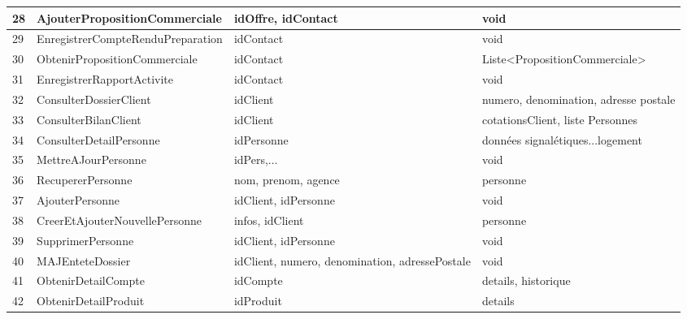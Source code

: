 \begin{table}[H]
{\begin{tabular}{p{1cm}|p{5cm}p{6cm}p{6cm}}
            28 & AjouterPropositionCommerciale      & idOffre, idContact                                            & void\\ \hline
            29 & EnregistrerCompteRenduPreparation  & idContact                                                     & void\\ \hline
            30 & ObtenirPropositionCommerciale      & idContact                                                     & Liste<PropositionCommerciale>\\ \hline
            31 & EnregistrerRapportActivite         & idContact                                                     & void\\ \hline
            32 & ConsulterDossierClient             & idClient                                                      & numero, denomination, adresse postale\\ \hline
            33 & ConsulterBilanClient               & idClient                                                      & cotationsClient, liste Personnes\\ \hline
            34 & ConsulterDetailPersonne            & idPersonne                                                    & données signalétiques...logement\\ \hline
            35 & MettreAJourPersonne                & idPers,...                                                    & void\\ \hline
            36 & RecupererPersonne                  & nom, prenom, agence                                           & personne\\ \hline
            37 & AjouterPersonne                    & idClient, idPersonne                                          & void\\ \hline
            38 & CreerEtAjouterNouvellePersonne     & infos, idClient                                               & personne\\ \hline
            39 & SupprimerPersonne                  & idClient, idPersonne                                          & void\\ \hline
            40 & MAJEnteteDossier                   & idClient, numero, denomination, adressePostale                & void\\ \hline
            41 & ObtenirDetailCompte                & idCompte                                                      & details, historique\\ \hline
            42 & ObtenirDetailProduit               & idProduit                                                     & details\\ \hline

\end{tabular}}
\end{table}
